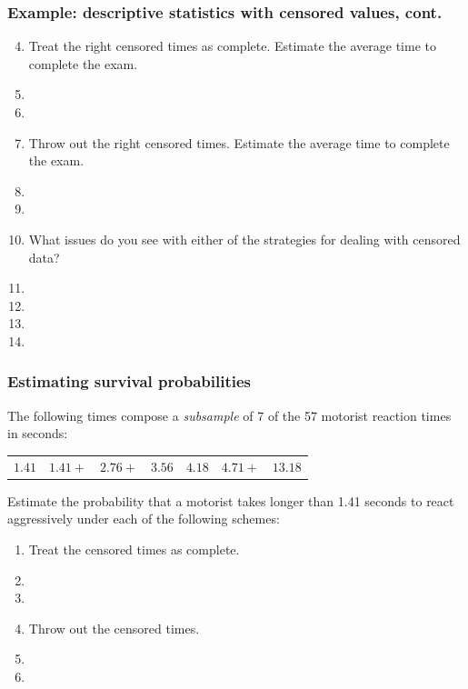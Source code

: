 \begin{frame}
\frametitle{Example: descriptive statistics with censored values, cont.}
\begin{enumerate}
\setcounter{enumi}{3}
\item Treat the right censored times as complete. Estimate the average time to complete the exam.
\item[] %
\item[]
\item Throw out the right censored times. Estimate the average time to complete the exam.
\item[] %
\item[]
\item What issues do you see with either of the strategies for dealing with censored data?
\item[] %
\item[] %
\item[]
\item[]
\end{enumerate}
\end{frame}

\begin{frame}
\frametitle{Estimating survival probabilities}
The following times compose a \emph{subsample} of 7 of the 57 motorist reaction times in seconds:
\begin{center}
\begin{tabular}{ccccccc}
$1.41$ & $1.41+$ & $2.76+$ & $3.56$ & $4.18$ &  $4.71+$   & $13.18$ \\
\end{tabular}
\end{center}
Estimate the probability that a motorist takes longer than 1.41 seconds to react aggressively under each of the following schemes:
\begin{enumerate}
\item Treat the censored times as complete.
\item[] %
\item[]
\item Throw out the censored times.
\item[] %
\item[]
\end{enumerate}
\end{frame}



